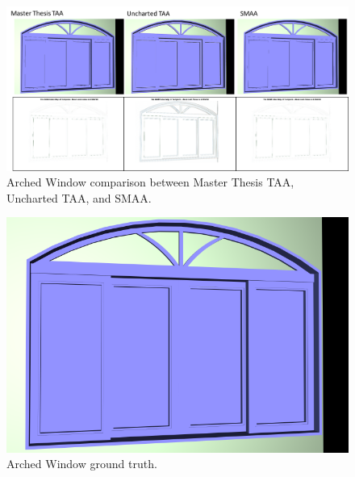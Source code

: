 \documentclass{cslthse-msc}
\begin{document}
\begin{figure}[H]
	\centering
	\includegraphics[scale=0.8]{images/results/window_arch.png}
	\caption{Arched Window comparison between Master Thesis TAA, Uncharted TAA, and SMAA.}\label{fig:window_arch_render}
\end{figure}

\begin{figure}[H]
	\centering
	\includegraphics[scale=0.18]{images/results/window_arch_sobel_ground_truth.png}
	\caption{Arched Window ground truth.}\label{fig:window_arch_truth}
\end{figure}
\end{document}
